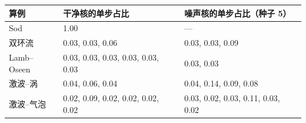 \begin{tabular}{lll}\toprule 算例 & 干净核的单步占比 & 噪声核的单步占比（种子 5）\\\midrule
Sod & 1.00 & —\\
双环流 & 0.03, 0.03, 0.06 & 0.03, 0.03, 0.09\\
Lamb–Oseen & 0.03, 0.03, 0.03, 0.03, 0.03, 0.03 & 0.03, 0.03\\
激波–涡 & 0.04, 0.06, 0.04 & 0.04, 0.14, 0.09, 0.08\\
激波–气泡 & 0.02, 0.09, 0.02, 0.02, 0.02, 0.02 & 0.03, 0.02, 0.03, 0.11, 0.03, 0.02\\
\bottomrule\end{tabular}
